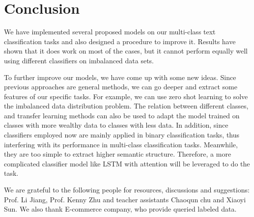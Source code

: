 \documentclass{acmtog}
\begin{document}
\section{Conclusion}
\label{sec:conclusion}
We have implemented several proposed models on our multi-class text classification tasks and also designed a procedure to improve it. Results have shown that it does work on most of the cases, but it cannot perform equally well using different classifiers on imbalanced data sets.   

To further improve our models, we have come up with some new ideas. Since previous approaches are general methods, we can go deeper and extract some features of our specific tasks. For example, we can use zero shot learning to solve the imbalanced data distribution problem. The relation between different classes, and transfer learning methods can also be used to adapt the model trained on classes with more wealthy data to classes with less data. In addition, since classifiers employed now are mainly applied in binary classification tasks, thus interfering with its performance in multi-class classification tasks. Meanwhile, they are too simple to extract higher semantic structure. Therefore, a more complicated classifier model like LSTM with attention will be leveraged to do the task.

\begin{acks}
We are grateful to the following people for resources, discussions and
suggestions: Prof. Li Jiang, Prof.
Kenny Zhu and teacher assistants Chaoqun chu and Xiaoyi Sun. We also thank E-commerce company, who provide queried labeled data.
\end{acks}



\end{document}
